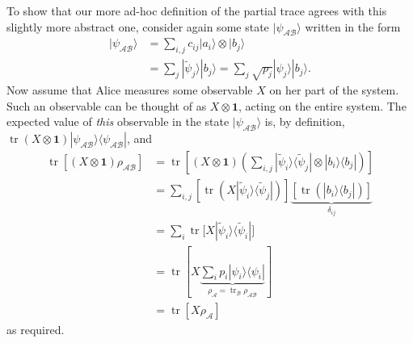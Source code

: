 \documentclass[fleqn]{article}
\begin{document}
To show that our more ad-hoc definition of the partial trace agrees with this slightly more abstract one, consider again some state \(|\psi_{\mathcal{AB}}\rangle\) written in the form
\[
  \begin{aligned}
    |\psi_{\mathcal{AB}}\rangle
    &= \sum_{i,j} c_{ij}|a_i\rangle\otimes|b_j\rangle
  \\&= \sum_{j} |\widetilde\psi_j\rangle|b_j\rangle
    = \sum_{j} \sqrt{p_j}|\psi_j\rangle|b_j\rangle.
  \end{aligned}
\]
Now assume that Alice measures some observable \(X\) on her part of the system.
Such an observable can be thought of as \(X\otimes\mathbf{1}\), acting on the entire system.
The expected value of \emph{this} observable in the state \(|\psi_{\mathcal{AB}}\rangle\) is, by definition, \(\operatorname{tr}(X\otimes\mathbf{1})|\psi_{\mathcal{AB}}\rangle\langle\psi_{\mathcal{AB}}|\), and
\[
  \begin{aligned}
    \operatorname{tr}[(X\otimes \mathbf{1}) \rho_{\mathcal{AB}}]
    &= \operatorname{tr}\left[
        (X\otimes\mathbf{1}) \left(
          \sum_{i,j} |\widetilde\psi_i\rangle\langle\widetilde\psi_j| \otimes |b_i\rangle\langle b_j|
        \right)
      \right]
  \\&= \sum_{i,j} \left[
        \operatorname{tr}\left(X |\widetilde\psi_i\rangle\langle\widetilde\psi_j|\right)
      \right]
      \underbrace{\left[\operatorname{tr}\left(|b_i\rangle\langle b_j|\right)\right]}_{\delta_{ij}}
  \\&= \sum_i \operatorname{tr}\big[X |\widetilde\psi_i\rangle\langle\widetilde\psi_i|\big]
  \\&= \operatorname{tr}\left[
      X \underbrace{\sum_i p_i|\psi_i\rangle\langle\psi_i|}_{\rho_{\mathcal{A}} = \operatorname{tr}_{\mathcal{B}}\rho_{\mathcal{AB}}}
    \right]
  \\&= \operatorname{tr}[X\rho_{\mathcal{A}}]
  \end{aligned}
\]
as required.
\end{document}
